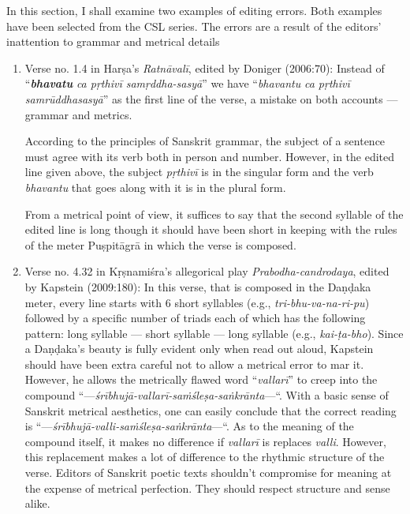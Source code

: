 In this section, I shall examine two examples of editing errors. Both examples have been selected from the CSL series. The errors are a result of the editors’ inattention to grammar and metrical details
\begin{enumerate}
\item Verse no. 1.4 in Harṣa’s \textsl{Ratnāvalī},
 edited by Doniger (2006:70): Instead of “{\sl\bfseries bhavatu} \textsl{ca pṛthivī samṛddha-sasyā}” we have “\textsl{bhavantu} \textsl{ca pṛthivī samrūddhasasyā}” as the first line of the verse, a mistake on both accounts --- grammar and metrics. 

According to the principles of Sanskrit grammar, the subject of a sentence must agree with its verb both in person and number. However, in the edited line given above, the subject \textsl{pṛthivī} is in the singular form and the verb \textsl{bhavantu} that goes along with it is in the plural form. 

From a metrical point of view, it suffices to say that the second syllable of the edited line is long though it should have been short in keeping with the rules of the meter Puṣpitāgrā in which the verse is composed.  

\item Verse no. 4.32 in Kṛṣnamiśra’s allegorical play \textsl{Prabodha-candrodaya}, edited by Kapstein (2009:180):  In this verse, that is composed in the Daṇḍaka meter, every line starts with 6 short syllables (e.g., \textsl{tri-bhu-va-na-ri-pu}) followed by a specific number of triads each of which has the following pattern: long syllable --- short syllable --- long syllable (e.g., \textsl{kai-ṭa-bho}). Since a Daṇḍaka’s beauty is fully evident only when read out aloud, Kapstein should have been extra careful not to allow a metrical error to mar it. However, he allows the metrically flawed word “\textsl{vallarī}” to creep into the compound “---\textsl{śrībhujā-}\textsl{vallarī-}\textsl{saṁśleṣa-saṅkrānta}—“. With a basic sense of Sanskrit metrical aesthetics, one can easily conclude that the correct reading is “---\textsl{śrībhujā-}\textsl{valli-}\textsl{saṁśleṣa-saṅkrānta}—“. As to the meaning of the compound itself, it makes no difference if \textsl{vallarī} is replaces \textsl{valli}. However, this replacement makes a lot of difference to the rhythmic structure of the verse. Editors of Sanskrit poetic texts shouldn’t compromise for meaning at the expense of metrical perfection. They should respect structure and sense alike.
\end{enumerate}

